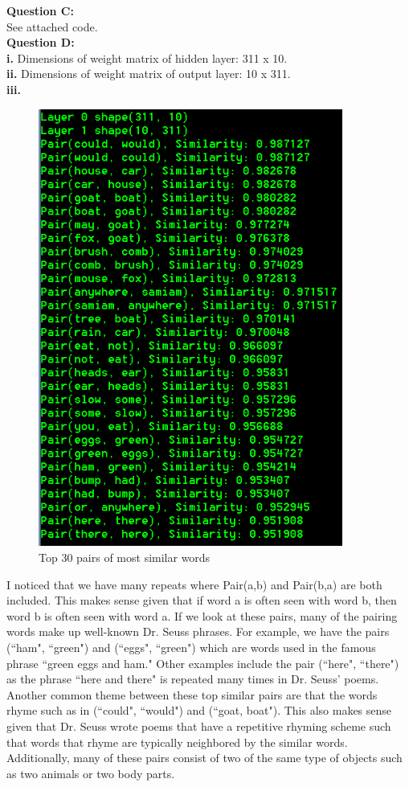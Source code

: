 \documentclass[12 pt]{article}
\begin{document}
	\noindent\textbf{Question C:} \\ See attached code. \\
	
	\noindent\textbf{Question D:} \\ 
	\textbf{i.} Dimensions of weight matrix of hidden layer: 311 x 10. \\
	\textbf{ii.} Dimensions of weight matrix of output layer: 10 x 311. \\
	\textbf{iii.}
	\begin{figure}[H]
		\centering
		\includegraphics[width=10cm]{Pairs}
		\caption{Top 30 pairs of most similar words}
	\end{figure}
	\noindent I noticed that we have many repeats where Pair(a,b) and Pair(b,a) are both included. This makes sense given that if word a is often seen with word b, then word b is often seen with word a. If we look at these pairs, many of the pairing words make up well-known Dr. Seuss phrases.  For example, we have the pairs (``ham", ``green") and (``eggs", ``green") which are words used in the famous phrase ``green eggs and ham."  Other examples include the pair (``here", ``there") as the phrase ``here and there" is repeated many times in Dr. Seuss' poems. Another common theme between these top similar pairs are that the words rhyme such as in (``could", ``would") and (``goat, boat"). This also makes sense given that Dr. Seuss wrote poems that have a repetitive rhyming scheme such that words that rhyme are typically neighbored by the similar words. Additionally, many of these pairs consist of two of the same type of objects such as two animals or two body parts. \\
	
\end{document}
